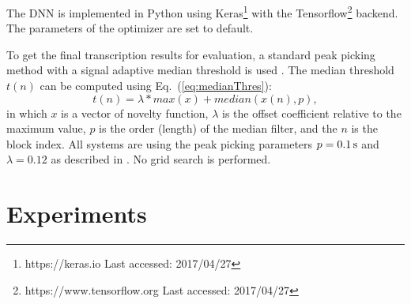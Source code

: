 \documentclass{article}
\begin{document}
The DNN is implemented in Python using Keras\footnote{https://keras.io Last accessed: 2017/04/27} with the Tensorflow\footnote{https://www.tensorflow.org Last accessed: 2017/04/27} backend. The parameters of the optimizer are set to default. 

To get the final transcription results for evaluation, a standard peak picking method with a signal adaptive median threshold is used \cite{Lerch2012}. The median threshold $t(n)$ can be computed using Eq.~(\ref{eq:medianThres}):
%
\begin{equation}\label{eq:medianThres}
t(n) = \lambda * max(x) + median(x(n), p) ,
\end{equation} 
in which $x$ is a vector of novelty function, $\lambda$ is the offset coefficient relative to the maximum value, $p$ is the order (length) of the median filter, and the $n$ is the block index. All systems are using the peak picking parameters $p = \unit[0.1]{s}$ and $\lambda = 0.12$ as described in \cite{Wu2015a}. No grid search is performed.  

\section{Experiments}\label{sec:experiments}
\end{document}
